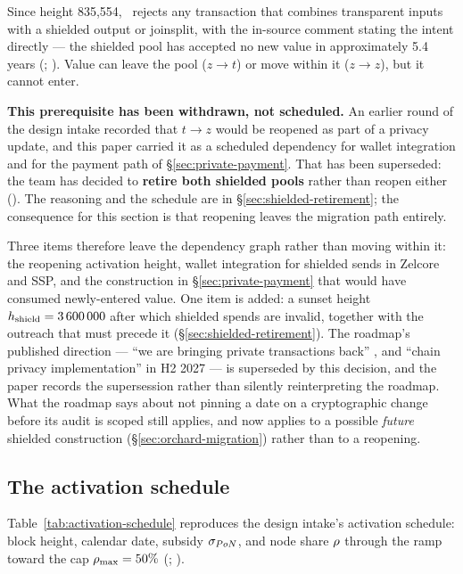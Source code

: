 Since height 835{,}554, \fluxd\ rejects any transaction that combines transparent inputs with a
shielded output or joinsplit, with the in-source comment stating the intent directly — the shielded
pool has accepted no new value in approximately 5.4 years (\shipped; ).
Value can leave the pool ($z \to t$) or move within it ($z \to z$), but it cannot enter.

\textbf{This prerequisite has been withdrawn, not scheduled.} An earlier round of the design intake
recorded that $t \to z$ would be reopened as part of a privacy update, and this paper carried it as a
scheduled dependency for wallet integration and for the payment path of
\S\ref{sec:private-payment}. That has been superseded: the team has decided to \textbf{retire both
shielded pools} rather than reopen either  (\planned).
The reasoning and the schedule are in \S\ref{sec:shielded-retirement}; the consequence for this
section is that reopening leaves the migration path entirely.

Three items therefore leave the dependency graph rather than moving within it: the reopening
activation height, wallet integration for shielded sends in Zelcore and SSP, and the construction in
\S\ref{sec:private-payment} that would have consumed newly-entered value. One item is added: a
sunset height $h_{\mathrm{shield}} = \num{3600000}$ after which shielded spends are invalid, together
with the outreach that must precede it (\S\ref{sec:shielded-retirement}). The roadmap's published direction --- ``we are bringing private
transactions back'' , and ``chain privacy implementation'' in
H2 2027  --- is superseded by this decision, and the paper
records the supersession rather than silently reinterpreting the roadmap. What the roadmap says about
not pinning a date on a cryptographic change before its audit is scoped
 still applies, and now applies to a possible \emph{future}
shielded construction (\S\ref{sec:orchard-migration}) rather than to a reopening.

\subsection{The activation schedule}\label{sec:26-schedule}

Table~\ref{tab:activation-schedule} reproduces the design intake's activation schedule: block
height, calendar date, \PoN subsidy $\sigma_{PoN}$, and node share $\rho$ through the ramp
toward the cap $\rho_{\max} = 50\%$ (\planned; ).

